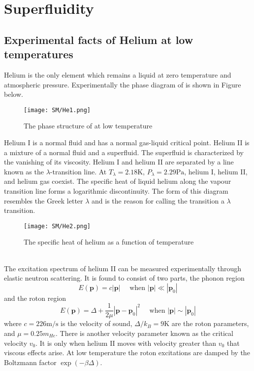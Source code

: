 \documentclass[cyan]{elegantnote}
\begin{document}
\section{Superfluidity}
\subsection{Experimental facts of Helium at low temperatures}
Helium is the only element which remains a liquid at zero temperature and atmospheric pressure.
Experimentally the phase diagram of  is shown in Figure below.
\begin{figure}[!h]
\centering
\texttt{[image: SM/He1.png]}
\caption{The phase structure of  at low temperature}
\end{figure}
Helium I is a normal fluid and has a normal gas-liquid critical point. Helium II is a mixture of a normal fluid and a superfluid. 
The superfluid is characterized by the vanishing of its viscosity. Helium I and helium II are separated by a line known as the $\lambda$-transition line.  At $T_{\lambda} = 2.18\mathrm{K}$, $P_{\lambda} = 2.29\mathrm{Pa}$, helium I, helium II, and helium gas coexist. 
The specific heat of liquid helium along the vapour transition line forms a logarithmic discontinuity. The form of this diagram resembles the Greek letter $\lambda$ and is the reason for calling the transition a $\lambda$ transition.
\begin{figure}[!h]
\centering
\texttt{[image: SM/He2.png]}
\caption{The specific heat of helium as a function of temperature}
\end{figure}
\\
The excitation spectrum of helium II can be measured experimentally through elastic neutron scattering. It is found to consist of two parts, the phonon region
\[E(\bm{p}) = c|\bm{p}| \quad \mbox{ when } |\bm{p}| \ll |\bm{p}_0|\]
and the roton region
\[E(\bm{p}) = \Delta + \frac{1}{2\mu} |\bm{p} - \bm{p}_0|^2 \quad \mbox{ when } |\bm{p}| \sim |\bm{p}_0|\]
where $c = 226 \mathrm{m/s}$ is the velocity of sound, $\Delta/k_B = 9\mathrm{K}$ are the roton parameters, and $\mu = 0.25m_{He}$. 
There is another velocity parameter known as the critical velocity $v_0$. It is only when helium II moves with velocity greater than $v_0$ that viscous effects arise. At low temperature the roton excitations are damped by the Boltzmann factor $\exp(-\beta \Delta)$.
\end{document}
